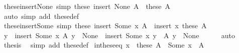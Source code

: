 \begin{isabellebody}
\endisatagproof
{\isafoldproof}%
%
\isadelimproof
\isanewline
%
\endisadelimproof
\isanewline
{}\isamarkupfalse%
\ these{\isacharunderscore}{\kern0pt}insert{\isacharunderscore}{\kern0pt}None\ {\isacharbrackleft}{\kern0pt}simp{\isacharbrackright}{\kern0pt}{\isacharcolon}{\kern0pt}\ {\isachardoublequoteopen}these\ {\isacharparenleft}{\kern0pt}insert\ None\ A{\isacharparenright}{\kern0pt}\ {\isacharequal}{\kern0pt}\ these\ A{\isachardoublequoteclose}\isanewline
%
\isadelimproof
\ \ %
\endisadelimproof
%
\isatagproof
{}\isamarkupfalse%
\ {\isacharparenleft}{\kern0pt}auto\ simp\ add{\isacharcolon}{\kern0pt}\ these{\isacharunderscore}{\kern0pt}def{\isacharparenright}{\kern0pt}%
\endisatagproof
{\isafoldproof}%
%
\isadelimproof
\isanewline
%
\endisadelimproof
\isanewline
{}\isamarkupfalse%
\ these{\isacharunderscore}{\kern0pt}insert{\isacharunderscore}{\kern0pt}Some\ {\isacharbrackleft}{\kern0pt}simp{\isacharbrackright}{\kern0pt}{\isacharcolon}{\kern0pt}\ {\isachardoublequoteopen}these\ {\isacharparenleft}{\kern0pt}insert\ {\isacharparenleft}{\kern0pt}Some\ x{\isacharparenright}{\kern0pt}\ A{\isacharparenright}{\kern0pt}\ {\isacharequal}{\kern0pt}\ insert\ x\ {\isacharparenleft}{\kern0pt}these\ A{\isacharparenright}{\kern0pt}{\isachardoublequoteclose}\isanewline
%
\isadelimproof
%
\endisadelimproof
%
\isatagproof
{}\isamarkupfalse%
\ {\isacharminus}{\kern0pt}\isanewline
\ \ \isamarkupfalse%
\ {\isachardoublequoteopen}{\isacharbraceleft}{\kern0pt}y\ {\isasymin}\ insert\ {\isacharparenleft}{\kern0pt}Some\ x{\isacharparenright}{\kern0pt}\ A{\isachardot}{\kern0pt}\ y\ {\isasymnoteq}\ None{\isacharbraceright}{\kern0pt}\ {\isacharequal}{\kern0pt}\ insert\ {\isacharparenleft}{\kern0pt}Some\ x{\isacharparenright}{\kern0pt}\ {\isacharbraceleft}{\kern0pt}y\ {\isasymin}\ A{\isachardot}{\kern0pt}\ y\ {\isasymnoteq}\ None{\isacharbraceright}{\kern0pt}{\isachardoublequoteclose}\isanewline
\ \ \ \ \isamarkupfalse%
\ auto\isanewline
\ \ \isamarkupfalse%
\ \isamarkupfalse%
\ {\isacharquery}{\kern0pt}thesis\ \isamarkupfalse%
\ {\isacharparenleft}{\kern0pt}simp\ add{\isacharcolon}{\kern0pt}\ these{\isacharunderscore}{\kern0pt}def{\isacharparenright}{\kern0pt}\isanewline
{}\isamarkupfalse%
%
\endisatagproof
{\isafoldproof}%
%
\isadelimproof
\isanewline
%
\endisadelimproof
\isanewline
{}\isamarkupfalse%
\ in{\isacharunderscore}{\kern0pt}these{\isacharunderscore}{\kern0pt}eq{\isacharcolon}{\kern0pt}\ {\isachardoublequoteopen}x\ {\isasymin}\ these\ A\ {\isasymlongleftrightarrow}\ Some\ x\ {\isasymin}\ A{\isachardoublequoteclose}\isanewline

\end{isabellebody}
